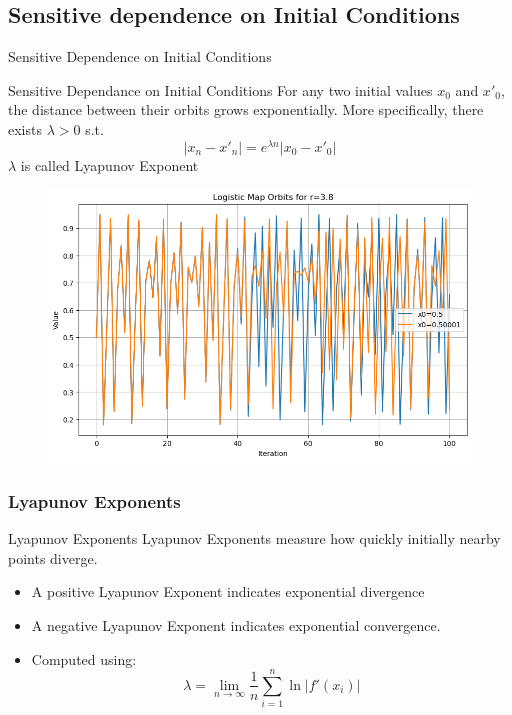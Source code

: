 \documentclass[
	11pt, %
]{beamer}
\begin{document}
\subsection{Sensitive dependence on Initial Conditions}
\begin{frame}{Sensitive Dependence on Initial Conditions}

\begin{block}{Sensitive Dependance on Initial Conditions}
    For any two initial values $x_0$ and $x'_0$, the distance between their orbits grows exponentially. More specifically, there exists $\lambda>0$ s.t.
    \[|x_n-x'_n| = e^{\lambda n}|x_0-x'_0|\]
    $\lambda$ is called Lyapunov Exponent
\end{block}
        \begin{figure}
	\includegraphics[scale=0.3]{./figures/sensitivity}
	\end{figure}

    
\end{frame}
\subsubsection{Lyapunov Exponents}
\begin{frame}{Lyapunov Exponents}
Lyapunov Exponents measure how quickly initially nearby points diverge.
\begin{itemize}
    \item A positive Lyapunov Exponent indicates exponential divergence
    \item A negative Lyapunov Exponent indicates exponential convergence.
    \item Computed using:
    \[\lambda=\lim_{n\to\infty}\frac{1}{n}\sum^n_{i=1}\ln|f'(x_i)|\]
\end{itemize}
\end{frame}
\end{document}
